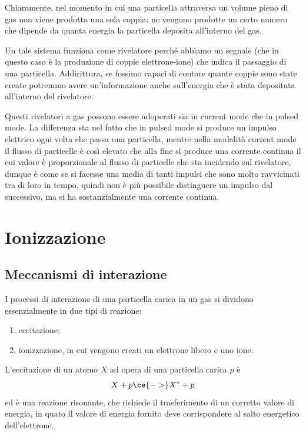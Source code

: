 Chiaramente, nel momento in cui una particella attraversa un volume pieno di gas non viene prodotta una sola coppia: ne vengono prodotte un certo numero che dipende da quanta energia la particella deposita all'interno del gas.

Un tale sistema funziona come rivelatore perché abbiamo un segnale (che in questo caso è la produzione di coppie elettrone-ione) che indica il passaggio di una particella. Addirittura, se fossimo capaci di contare quante coppie sono state create potremmo avere un'informazione anche sull'energia che è stata depositata all'interno del rivelatore. 

Questi rivelatori a gas possono essere adoperati sia in current mode che in pulsed mode. La differenza sta nel fatto che in pulsed mode si produce un impulso elettrico ogni volta che passa una particella, mentre nella modalità current mode il flusso di particelle è così elevato che alla fine si produce una corrente continua il cui valore è proporzionale al flusso di particelle che sta incidendo sul rivelatore, dunque è come se si facesse una media di tanti impulsi che sono molto ravvicinati tra di loro in tempo, quindi non è più possibile distinguere un impulso dal successivo, ma si ha sostanzialmente una corrente continua.

\section{Ionizzazione}

\subsection{Meccanismi di interazione}

I processi di interazione di una particella carica in un gas si dividono essenzialmente in due tipi di reazione:
\begin{enumerate}
   \item eccitazione;
   \item ionizzazione, in cui vengono creati un elettrone libero e uno ione.
\end{enumerate}
L'eccitazione di un atomo $X$ ad opera di una particella carica $p$ è
\begin{equation*}
   X + p \ce{->} X^* + p
\end{equation*}
ed è una reazione risonante, che richiede il trasferimento di un corretto valore di energia, in quato il valore di energia fornito deve corrispondere al salto energetico dell'elettrone.

